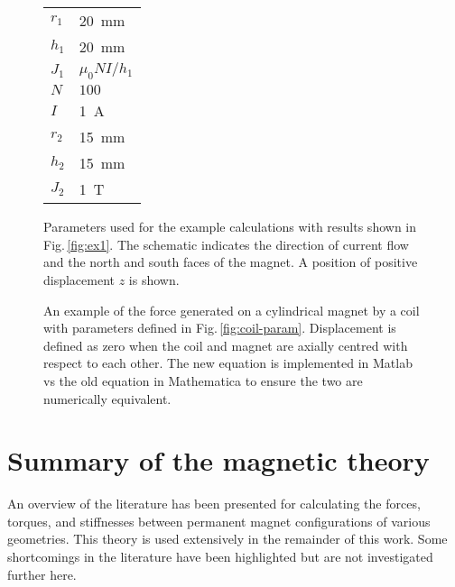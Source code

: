 \documentclass[11pt,a4paper]{memoir}
\begin{document}
\begin{figure}
\centering
\hspace{-4cm}\hspace{-2cm}%
  \begin{tabular}[b]{@{}ll@{}}
  \toprule
  $r_1$ &   \SI{20}{mm} \\
  $h_1$ &   \SI{20}{mm} \\
  $J_1$ & $\mu_0NI/h_1$ \\
  $N$ & $100$ \\
  $I$ & \SI{1}{A} \\
  \midrule
  $r_2$ & \SI{15}{mm} \\
  $h_2$ & \SI{15}{mm} \\
  $J_2$ & \SI{1}{T}\\
  \bottomrule
  \end{tabular}
\caption{Parameters used for the example calculations with results shown in Fig.\,\ref{fig:ex1}. The schematic indicates the direction of current flow and the north and south faces of the magnet. A position of positive displacement $z$ is shown.}
\end{figure}


\begin{figure}
  \centering
  \caption{An example of the force generated on a cylindrical magnet by a coil with parameters defined in Fig.\,\ref{fig:coil-param}. Displacement is defined as zero when the coil and magnet are axially centred with respect to each other. The new equation is implemented in Matlab vs the old equation in Mathematica to ensure the two are numerically equivalent.}
\end{figure}


\section{Summary of the magnetic theory}

An overview of the literature has been presented for calculating the forces, torques, and stiffnesses between permanent magnet configurations of various geometries.
This theory is used extensively in the remainder of this work.
Some shortcomings in the literature have been highlighted but are not investigated further here.
\end{document}
